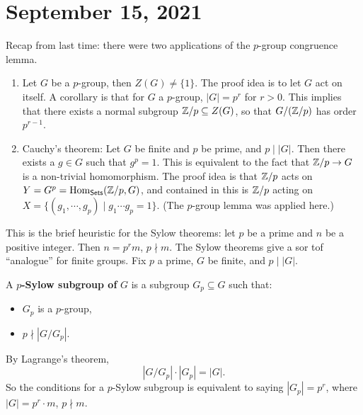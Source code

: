 \section{September 15, 2021} 
Recap from last time: there were two applications of the $p$-group congruence lemma.
\begin{enumerate}[label=(\arabic*)]
\setlength\itemsep{-.2em}
    \item Let $G$ be a $p$-group, then $Z(G) \neq \{1\} $. The proof idea is to let $G$ act on itself. A corollary is that for $G$ a $p$-group, $|G|=p^r$ for $r>0$. This implies that there exists a normal subgroup $\mathbb{Z} / p \subseteq Z(G)$, so that $G / (\mathbb{Z} /p)$ has order $p ^{r-1}$.
    \item Cauchy's theorem: Let $G$ be finite and $p$ be prime, and $p \mid  |G|$. Then there exists a $g \in G$ such that $g ^p=1$. This is equivalent to the fact that $\mathbb{Z} /p \to G$ is a non-trivial homomorphism. The proof idea is that $\mathbb{Z} / p$ acts on $Y= G^p=\operatorname{Hom} _{\mathsf{Sets} }(\mathbb{Z} /p, G)$, and contained in this is $\mathbb{Z} /p$ acting on $X= \{(g_1,\cdots ,g_p) \mid  g_1 \cdots g_p=1\} $. (The $p$-group lemma was applied here.)
\end{enumerate}

 This is the brief heuristic for the Sylow theorems: let $p$ be a prime and $n$ be a positive integer. Then $n=p^r m$, $p \nmid m$. The Sylow theorems give a sor tof ``analogue'' for finite groups. Fix $p$ a prime, $G$ be finite, and $p \mid |G|$.

 \begin{definition}[]
     A $p$\textbf{-Sylow subgroup of} $G$ is a subgroup $G_p \subseteq G$ such that:
     \begin{itemize}
     \setlength\itemsep{-.2em}
         \item $G_p$ is a $p$-group,
            \item $p \nmid |G / G_p|$.
     \end{itemize}
 \end{definition}
 \begin{note}
    By Lagrange's theorem, \[
    |G /G_p| \cdot |G_p|=|G|.
\]  So the conditions for a $p$-Sylow subgroup is equivalent to saying $|G_p|=p^r$, where $|G|=p^r \cdot m$, $p \nmid m$.
 \end{note}


